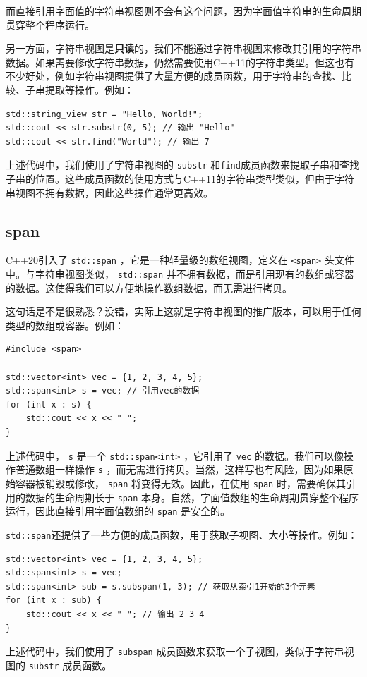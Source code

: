 而直接引用字面值的字符串视图则不会有这个问题，因为字面值字符串的生命周期贯穿整个程序运行。

另一方面，字符串视图是\textbf{只读}的，我们不能通过字符串视图来修改其引用的字符串数据。如果需要修改字符串数据，仍然需要使用C++11的字符串类型。但这也有不少好处，例如字符串视图提供了大量方便的成员函数，用于字符串的查找、比较、子串提取等操作。例如：
\begin{verbatim}
std::string_view str = "Hello, World!";
std::cout << str.substr(0, 5); // 输出 "Hello"
std::cout << str.find("World"); // 输出 7
\end{verbatim}
上述代码中，我们使用了字符串视图的 \verb|substr| 和\verb|find|成员函数来提取子串和查找子串的位置。这些成员函数的使用方式与C++11的字符串类型类似，但由于字符串视图不拥有数据，因此这些操作通常更高效。

\subsection{span}

C++20引入了 \verb|std::span| ，它是一种轻量级的数组视图，定义在 \verb|<span>| 头文件中。与字符串视图类似， \verb|std::span| 并不拥有数据，而是引用现有的数组或容器的数据。这使得我们可以方便地操作数组数据，而无需进行拷贝。

这句话是不是很熟悉？没错，实际上这就是字符串视图的推广版本，可以用于任何类型的数组或容器。例如：
\begin{verbatim}
#include <span>

std::vector<int> vec = {1, 2, 3, 4, 5};
std::span<int> s = vec; // 引用vec的数据
for (int x : s) {
    std::cout << x << " ";
}
\end{verbatim}
上述代码中， \verb|s| 是一个 \verb|std::span<int>| ，它引用了 \verb|vec| 的数据。我们可以像操作普通数组一样操作 \verb|s| ，而无需进行拷贝。当然，这样写也有风险，因为如果原始容器被销毁或修改， \verb|span| 将变得无效。因此，在使用 \verb|span| 时，需要确保其引用的数据的生命周期长于 \verb|span| 本身。自然，字面值数组的生命周期贯穿整个程序运行，因此直接引用字面值数组的 \verb|span| 是安全的。

\verb|std::span|还提供了一些方便的成员函数，用于获取子视图、大小等操作。例如：
\begin{verbatim}
std::vector<int> vec = {1, 2, 3, 4, 5};
std::span<int> s = vec;
std::span<int> sub = s.subspan(1, 3); // 获取从索引1开始的3个元素
for (int x : sub) {
    std::cout << x << " "; // 输出 2 3 4
}
\end{verbatim}
上述代码中，我们使用了 \verb|subspan| 成员函数来获取一个子视图，类似于字符串视图的 \verb|substr| 成员函数。

